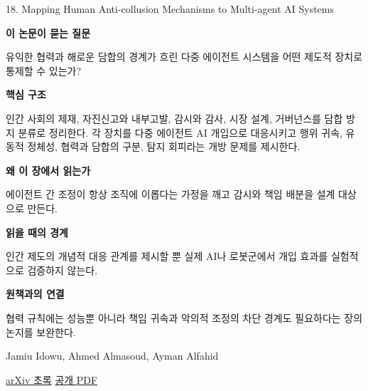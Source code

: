 \documentclass[11pt,openany]{book}
\begin{document}
\begin{termcard}{18. Mapping Human Anti-collusion Mechanisms to Multi-agent AI Systems}

\par

\medskip

{\sffamily\bfseries\color{deepblue} 이 논문이 묻는 질문}\par

유익한 협력과 해로운 담합의 경계가 흐린 다중 에이전트 시스템을 어떤 제도적 장치로 통제할 수 있는가?

\smallskip

{\sffamily\bfseries\color{deepblue} 핵심 구조}\par

인간 사회의 제재, 자진신고와 내부고발, 감시와 감사, 시장 설계, 거버넌스를 담합 방지 분류로 정리한다. 각 장치를 다중 에이전트 AI 개입으로 대응시키고 행위 귀속, 유동적 정체성, 협력과 담합의 구분, 탐지 회피라는 개방 문제를 제시한다.

\smallskip

{\sffamily\bfseries\color{deepblue} 왜 이 장에서 읽는가}\par

에이전트 간 조정이 항상 조직에 이롭다는 가정을 깨고 감시와 책임 배분을 설계 대상으로 만든다.

\smallskip

{\sffamily\bfseries\color{coral} 읽을 때의 경계}\par

인간 제도의 개념적 대응 관계를 제시할 뿐 실제 AI나 로봇군에서 개입 효과를 실험적으로 검증하지 않는다.

\smallskip

{\sffamily\bfseries\color{teal} 원책과의 연결}\par

협력 규칙에는 성능뿐 아니라 책임 귀속과 악의적 조정의 차단 경계도 필요하다는 장의 논지를 보완한다.

\medskip

{\footnotesize\color{muted} Jamiu Idowu, Ahmed Almasoud, Ayman Alfahid\par

\href{https://arxiv.org/abs/2601.00360}{arXiv 초록} \quad \href{https://arxiv.org/pdf/2601.00360}{공개 PDF}\par}

\end{termcard}
\end{document}
